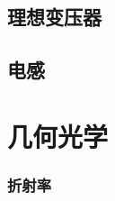 \documentclass[cn,blue,11pt,normal]{elegantnote}
\begin{document}
\subsection{理想变压器}
\begin{proset}
	
\end{proset}

\subsection{电感}
\begin{proset}
	
\end{proset}

\iffalse

\newpage
\section{几何光学}
\begin{proset}
	
\end{proset}
\subsubsection{折射率}
\begin{proset}
	
\end{proset}
\begin{proset}
	
\end{proset}
\begin{proset}
	
\end{proset}
\begin{proset}
	
\end{proset}
\end{document}
